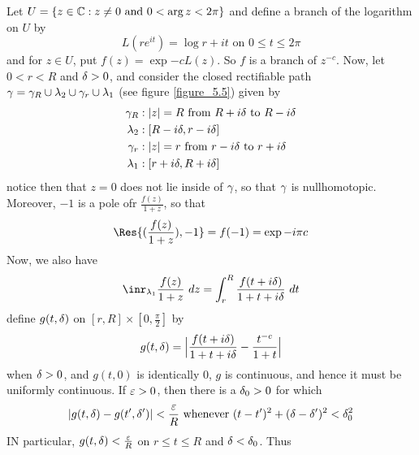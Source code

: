 \begin{example}
\begin{enumerate}
           Let $U=\{z \in \mathbb{C} : z \neq 0 \text{ and } 0<\arg{z}<2\pi\}$ and
           define a branch of the logarithm on $U$ by
           \begin{equation*}
               L(re^{it})=\log{r}+it \text{ on } 0 \leq t \leq 2\pi
           \end{equation*}
           and for $z \in U$, put  $f(z)=\exp{-cL(z)}$. So $f$ is a branch of
           $z^{-c}$. Now, let $0<r<R$ and  $\delta>0$, and consider the closed
           rectifiable path $\gamma=\gamma_R \cup \lambda_2 \cup \gamma_r \cup \lambda_1$ (see figure
           \ref{figure_5.5}) given by
           \begin{align*}
               \gamma_R  &:  |z|=R \text{ from } R+i\delta \text{ to } R-i\delta \\
               \lambda_2 &:  [R-i\delta,r-i\delta]   \\
               \gamma_r &:  |z|=r \text{ from } r-i\delta \text{ to } r+i\delta \\
               \lambda_1 &:  [r+i\delta,R+i\delta]
           \end{align*}
           notice then that $z=0$ does not lie inside of $\gamma$, so that  $\gamma$ is
           nullhomotopic. Moreover,  $-1$ is a pole ofr  $\frac{f(z)}{1+z}$, so
           that
           \begin{equation*}
               \Res{(\frac{f(z)}{1+z}),-1}=f(-1)=\exp{-i\pi{c}}
           \end{equation*}
           Now, we also have
           \begin{equation*}
               \inr_{\l_1}{\frac{f(z)}{1+z} \ dz}=
               \int_r^R{\frac{f(t+i\d)}{1+t+i\d} \ dt}
           \end{equation*}
           define $g(t,\delta)$ on $[r,R] \times [0,\frac{\pi}{2}]$ by
           \begin{equation*}
               g(t,\delta)=\Big{|} \frac{f(t+i\delta)}{1+t+i\delta}-\frac{t^{-c}}{1+t} \Big{|}
           \end{equation*}
           when $\delta>0$, and  $g(t,0)$ is identically $0$, $g$ is continuous, and
           hence it must be uniformly continuous. If  $\varepsilon>0$, then there is a
           $\delta_0>0$ for which
           \begin{equation*}
               |g(t,\delta)-g(t',\delta')|<\frac{\varepsilon}{R} \text{ whenever }
               (t-t')^2+(\delta-\delta')^2<\delta_0^2
           \end{equation*}
           IN particular, $g(t,\delta)<\frac{\varepsilon}{R}$ on $r \leq t \leq R$ and
           $\delta<\delta_0$. Thus
           \begin{equation*}

\end{equation*}
\end{enumerate}
\end{example}
